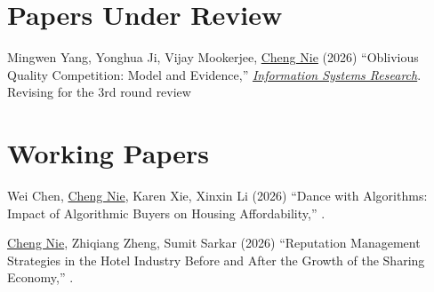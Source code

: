 \documentclass[paper=letter,fontsize=10pt]{scrartcl} %
\newcommand{\NewPart}[2]{\section*{{#1} #2}}
\newcommand{\WPEntry}[5]{
        \noindent #1 (#2) ``#3,'' \textit{\ul{#4}}. #5}
\newcommand{\Nie}{\underline{Cheng Nie}}
\begin{document}

\NewPart{Papers Under Review}{}
\begin{etaremune}

\item \WPEntry{Mingwen Yang, Yonghua Ji, Vijay Mookerjee, \Nie}{2026}{Oblivious Quality Competition: Model and Evidence}{\protect\newline Information Systems Research}{Revising for the 3rd round review}{} 


\end{etaremune}




\NewPart{Working Papers}{}

\begin{etaremune}


\item \WPEntry{Wei Chen, \Nie, Karen Xie, Xinxin Li}{2026}{Dance with Algorithms: Impact of Algorithmic Buyers on Housing Affordability}{}{}{}

\item \WPEntry{\Nie, Zhiqiang Zheng, Sumit Sarkar}{2026}{Reputation Management Strategies in the Hotel Industry Before and After the Growth of the Sharing Economy}{}{}{} 




\end{etaremune}

\end{document}
